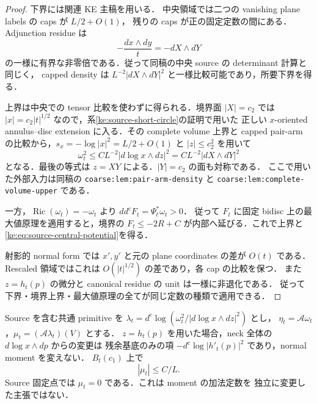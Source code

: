 \begin{proof}
下界には関連 KE 主稿\cite[
\texttt{coarse:cor:degree-d-volume-lower}]{KELocalCurrent}を用いる．
中央領域では二つの vanishing plane labels の caps が $L/2+O(1)$，
残りの caps が正の固定定数の間にある．Adjunction residue は
\[
 -\frac{dx\wedge dy}{t}=-dX\wedge dY
\]
の一様に有界な非零倍である．従って同稿の中央 source の determinant 計算と同じく，
capped density は $L^{-2}|dX\wedge dY|^2$ と一様比較可能であり，所要下界を得る．

上界は中央での tensor 比較を使わずに得られる．境界面 $|X|=c_2$ では
$|x|=c_2|t|^{1/2}$ なので，系\ref{ke:source-short-circle}の証明で用いた
正しい $x$-oriented annulus--disc extension に入る．その complete volume
上界と capped pair-arm の比較から，$s_x=-\log|x|^2=L/2+O(1)$ と
$|z|\le c_2^2$ を用いて
\[
 \omega_t^2\le CL^{-2}|d\log x\wedge dz|^2
 =CL^{-2}|dX\wedge dY|^2
\]
となる．最後の等式は $z=XY$ による．$|Y|=c_2$ の面も対称である．
ここで用いた外部入力は同稿の
\texttt{coarse:lem:pair-arm-density} と
\texttt{coarse:lem:complete-volume-upper} である．

一方，$\operatorname{Ric}(\omega_t)=-\omega_t$ より $dd^c F_t=\Psi_t^*\omega_t>0$．
従って $F_t$ に固定 bidisc 上の最大値原理を適用すると，境界の
$F_t\le-2R+C$ が内部へ延びる．これで上界と
\eqref{ke:eq:source-central-potential}を得る．

射影的 normal form では $x',y'$ と元の plane coordinates の差が $O(t)$ である．
Rescaled 領域ではこれは $O(|t|^{1/2})$ の差であり，各 cap の比較を保つ．
また $z=h_t(p)$ の微分と canonical residue の unit は一様に非退化である．
従って下界・境界上界・最大値原理の全てが同じ定数の種類で適用できる．
\end{proof}

\begin{corollary}
\label{ke:source-central-moment}
Source を含む共通 primitive を
$\lambda_t=d^c\log(\omega_t^2/|d\log x\wedge dz|^2)$ とし，
$\eta_t=\mathcal A\omega_t$，$\mu_t=(\mathcal A\lambda_t)(V)$ とする．
$z=h_t(p)$ を用いた場合，neck 全体の $d\log x\wedge dp$ からの変更は
残余基底のみの項 $-d^c\log|h'_t(p)|^2$ であり，normal moment を変えない．
$B_t(c_1)$ 上で
\[
 |\mu_t|\le C/L.
\]
Source 固定点では $\mu_t=0$ である．これは moment の加法定数を
独立に変更した主張ではない．
\end{corollary}

